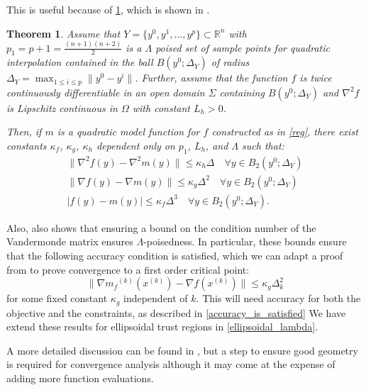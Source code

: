\documentclass{article}
\newtheorem{theorem}{Theorem}[section]
\theoremstyle{case}
\newcommand{\xk}{{x^{(k)}}}
\newcommand{\Rn}{\mathbb R^n}
\newcommand{\dk}{\Delta_k}
\newcommand{\mfk}{{{m}_f}^{(k)}}
\newcommand{\gradf}{\nabla f}
\begin{document}
This is useful because of \cref{quadratic_errors}, which is shown in \cite{DUMMY:intro_book}.

\begin{theorem}
\label{quadratic_errors}
Assume that $Y = \{y^0, y^1, \ldots, y^p\} \subset \Rn$ with $p_1 = p+1= \frac{(n+1)(n+2)}{2}$ is a $\Lambda$
poised set of sample points for quadratic interpolation contained in the ball $B(y^0; \Delta_Y)$ of radius $\Delta_Y = \max_{1\le i \le p} \|y^0 - y^i\|$.
Further, assume that the function $f$ is twice continuously differentiable in an open domain $\Sigma$ containing $B(y^0; \Delta_Y)$ and $\nabla^2 f$
is Lipschitz continuous in $\Omega$ with constant $L_h > 0$.

Then, if $m$ is a quadratic model function for $f$ constructed as in \cref{reg}, there exist constants $\kappa_f$, $\kappa_g$, $\kappa_h$ dependent only on $p_1$, $L_h$, and $\Lambda$ such that:
\begin{align}
\|\nabla^2 f(y) - \nabla^2 m(y)\| \le \kappa_{h} \Delta \quad \forall y \in B_2(y^0; \Delta_Y) \label{error_in_hessian}\\
\|\gradf(y) - \nabla m(y)\| \le \kappa_{g} \Delta^2 \quad \forall y \in B_2(y^0; \Delta_Y) \label{error_in_gradient} \\
|f(y) - m(y) | \le \kappa_{f} \Delta^3 \quad \forall y \in B_2(y^0; \Delta_Y). \label{error_in_function} 
\end{align}
\end{theorem}


Also, \cite{DUMMY:intro_book} also shows that ensuring a bound on the condition number of the Vandermonde matrix ensures $\Lambda$-poisedness.
In particular, these bounds ensure that the following accuracy condition is satisfied, which we can adapt a proof from \cite{Conejo:2013:GCT:2620806.2621814} to prove convergence to a first order critical point: 
\begin{equation}
\label{accuracy}
\|\nabla \mfk(\xk) - \gradf(\xk) \| \le \kappa_g \dk^2
\end{equation}
for some fixed constant $\kappa_g$ independent of $k$.
This will need accuracy for both the objective and the constraints, as described in \cref{accuracy_is_satisfied}
We have extend these results for ellipsoidal trust regions in \cref{ellipsoidal_lambda}.
 
A more detailed discussion can be found in \cite{doi:10.1080/10556780802409296}, but a step to ensure good geometry is required for convergence analysis although it may come at the expense of adding more function evaluations.
\end{document}
